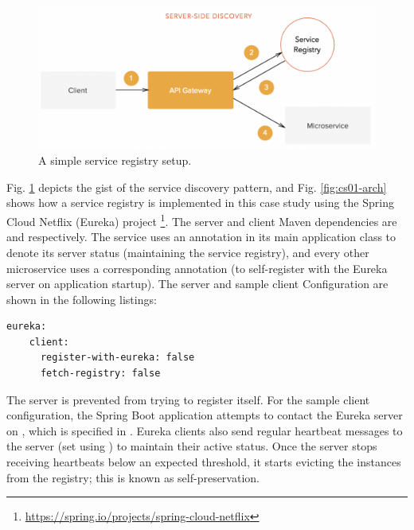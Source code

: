 \begin{figure}[H]
	\centering
	\includegraphics[width=0.7\linewidth]{./assets/images/case-studies/server-side-discovery.png}
	\caption{A simple service registry setup.}
	\label{fig:server-side-discovery}
\end{figure}

Fig. \ref{fig:server-side-discovery} depicts the gist of the service discovery pattern, and Fig. \ref{fig:cs01-arch} shows how a service registry is implemented in this case study using the Spring Cloud Netflix (Eureka) project \footnote{\url{https://spring.io/projects/spring-cloud-netflix}}. The server and client Maven dependencies are  and  respectively. The  service uses an  annotation in its main application class to denote its server status (maintaining the service registry), and every other microservice uses a corresponding  annotation (to self-register with the Eureka server on application startup). The server and sample client Configuration are shown in the following listings:

\begin{lstlisting}[caption=Snippet from Eureka server's application properties]
  eureka:
    client:
      register-with-eureka: false
      fetch-registry: false
\end{lstlisting}

The server is prevented from trying to register itself. For the sample client configuration, the Spring Boot application attempts to contact the Eureka server on , which is specified in . Eureka clients also send regular heartbeat messages to the server (set using ) to maintain their active status. Once the server stops receiving heartbeats below an expected threshold, it starts evicting the instances from the registry; this is known as self-preservation.

